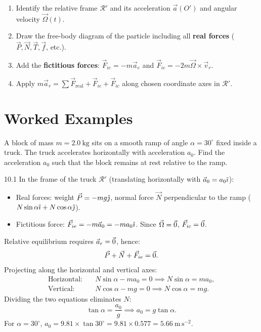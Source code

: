 \begin{method}
\begin{enumerate}[leftmargin=1.5em,itemsep=2pt]
  \item Identify the relative frame $\mathcal{R}'$ and its acceleration $\vec{a}(O')$ and angular velocity $\vec{\Omega}(t)$.
  \item Draw the free-body diagram of the particle including all \textbf{real forces} ($\vec{P}, \vec{N}, \vec{T}, \vec{f}$, etc.).
  \item Add the \textbf{fictitious forces}: $\vec{F}_{ie} = -m\vec{a}_e$ and $\vec{F}_{ic} = -2m\vec{\Omega}\times\vec{v}_r$.
  \item Apply $m\vec{a}_r = \sum\vec{F}_{\text{real}} + \vec{F}_{ie} + \vec{F}_{ic}$ along chosen coordinate axes in $\mathcal{R}'$.
\end{enumerate}
\end{method}

\section{Worked Examples}

\begin{worked}
A block of mass $m=2.0\ \mathrm{kg}$ sits on a smooth ramp of angle $\alpha=30^\circ$ fixed inside a truck. The truck accelerates horizontally with acceleration $a_0$. Find the acceleration $a_0$ such that the block remains at rest relative to the ramp.
\end{worked}

\begin{solution}{10.1}
In the frame of the truck $\mathcal{R}'$ (translating horizontally with $\vec{a}_0 = a_0\hat{\imath}$):
\begin{itemize}[leftmargin=1.4em,itemsep=2pt]
  \item Real forces: weight $\vec{P} = -mg\hat{\jmath}$, normal force $\vec{N}$ perpendicular to the ramp ($N\sin\alpha\hat{\imath} + N\cos\alpha\hat{\jmath}$).
  \item Fictitious force: $\vec{F}_{ie} = -m\vec{a}_0 = -m a_0\hat{\imath}$. Since $\vec{\Omega}=\vec{0}$, $\vec{F}_{ic}=\vec{0}$.
\end{itemize}
Relative equilibrium requires $\vec{a}_r = \vec{0}$, hence:
\[
\vec{P} + \vec{N} + \vec{F}_{ie} = \vec{0}.
\]
Projecting along the horizontal and vertical axes:
\begin{align*}
\text{Horizontal:}\quad & N\sin\alpha - m a_0 = 0 \implies N\sin\alpha = m a_0, \\
\text{Vertical:}\quad & N\cos\alpha - mg = 0 \implies N\cos\alpha = mg.
\end{align*}
Dividing the two equations eliminates $N$:
\[
\tan\alpha = \frac{a_0}{g} \implies \boxed{a_0 = g\tan\alpha.}
\]
For $\alpha=30^\circ$, $a_0 = 9.81\times\tan 30^\circ = 9.81\times 0.577 = 5.66\ \mathrm{m\,s^{-2}}$.
\end{solution}

